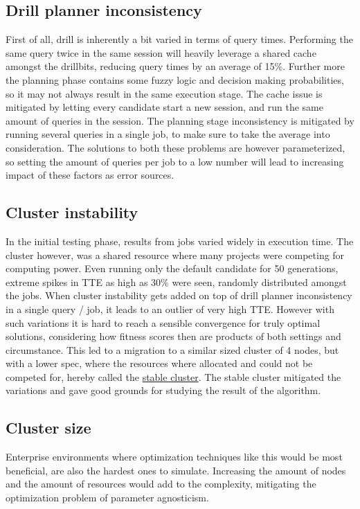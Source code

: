 \documentclass[a4paper,english]{report}
\begin{document}
		\subsection{Drill planner inconsistency}
		First of all, drill is inherently a bit varied in terms of query times. Performing the same query twice in the same session will heavily leverage a shared cache amongst the drillbits, reducing query times by an average of 15\%. Further more the planning phase contains some fuzzy logic and decision making probabilities, so it may not always result in the same execution stage. The cache issue is mitigated by letting every candidate start a new session, and run the same amount of queries in the session. The planning stage inconsistency is mitigated by running several queries in a single job, to make sure to take the average into consideration. The solutions to both these problems are however parameterized, so setting the amount of queries per job to a low number will lead to increasing impact of these factors as error sources.
		\subsection{Cluster instability}
		In the initial testing phase, results from jobs varied widely in execution time. The cluster however, was a shared resource where many projects were competing for computing power. Even running only the default candidate for 50 generations, extreme spikes in TTE as high as 30\% were seen, randomly distributed amongst the jobs. When cluster instability gets added on top of drill planner inconsistency in a single query / job, it leads to an outlier of very high TTE. However with such variations it is hard to reach a sensible convergence for truly optimal solutions, considering how fitness scores then are products of both settings and circumstance. This led to a migration to a similar sized cluster of 4 nodes, but with a lower spec, where the resources where allocated and could not be competed for, hereby called the \hyperref[table:cluster_stable]{stable cluster}. The stable cluster mitigated the variations and gave good grounds for studying the result of the algorithm. 
		\subsection{Cluster size}
		Enterprise environments where optimization techniques like this would be most beneficial, are also the hardest ones to simulate. Increasing the amount of nodes and the amount of resources would add to the complexity, mitigating the optimization problem of parameter agnosticism. 
\end{document}
